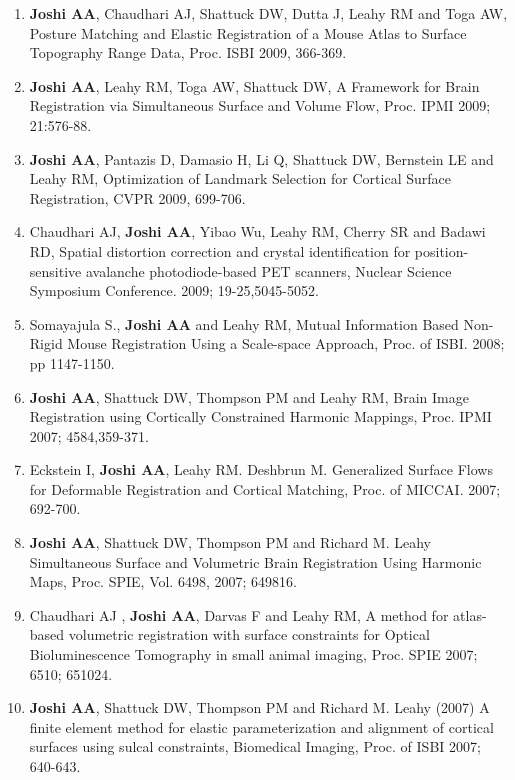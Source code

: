 \documentclass[overlapped,line,letterpaper]{res}
\begin{document}
\begin{resume}
\begin{enumerate}
    \item \textbf{Joshi AA}, Chaudhari AJ, Shattuck DW, Dutta J, Leahy RM and Toga AW, {Posture Matching and Elastic Registration of a Mouse Atlas to Surface Topography Range Data}, Proc. ISBI 2009, 366-369.

    \item \textbf{Joshi AA}, Leahy RM, Toga AW, Shattuck DW, {A Framework for Brain Registration via Simultaneous Surface and Volume Flow}, Proc. IPMI 2009; 21:576-88.

    \item \textbf{Joshi AA}, Pantazis D, Damasio H, Li Q, Shattuck DW, Bernstein LE and Leahy RM, {Optimization of Landmark Selection for Cortical Surface Registration}, CVPR 2009, 699-706. 

    \item Chaudhari AJ, \textbf{Joshi AA}, Yibao Wu, Leahy RM, Cherry SR and Badawi RD, {Spatial distortion correction and crystal identification for position-sensitive avalanche photodiode-based PET scanners}, Nuclear Science Symposium Conference. 2009; 19-25,5045-5052.

    \item Somayajula S., \textbf{Joshi AA}  and Leahy RM, {Mutual Information Based Non-Rigid Mouse Registration Using a  Scale-space Approach}, Proc. of ISBI. 2008; pp 1147-1150. 

    \item \textbf{Joshi AA}, Shattuck DW, Thompson PM and Leahy RM, {Brain Image Registration using Cortically Constrained Harmonic Mappings}, Proc. IPMI 2007; 4584,359-371.

    \item Eckstein I, \textbf{Joshi AA}, Leahy RM. Deshbrun M. {Generalized Surface Flows for Deformable Registration and Cortical Matching}, Proc. of MICCAI. 2007; 692-700.

    \item \textbf{Joshi AA}, Shattuck DW, Thompson PM and Richard M. Leahy {Simultaneous Surface and Volumetric Brain Registration Using Harmonic Maps}, Proc. SPIE, Vol. 6498, 2007; 649816.

    \item Chaudhari AJ , \textbf{Joshi AA}, Darvas F and Leahy RM, {A method for atlas-based volumetric registration with surface constraints for Optical Bioluminescence Tomography in small animal imaging}, Proc. SPIE 2007; 6510; 651024.

    \item \textbf{Joshi AA}, Shattuck DW, Thompson PM and Richard M. Leahy (2007) {A finite element method for elastic parameterization and alignment of cortical surfaces using sulcal constraints, Biomedical Imaging}, Proc. of ISBI 2007; 640-643. 


\end{enumerate}
\end{resume}
\end{document}
